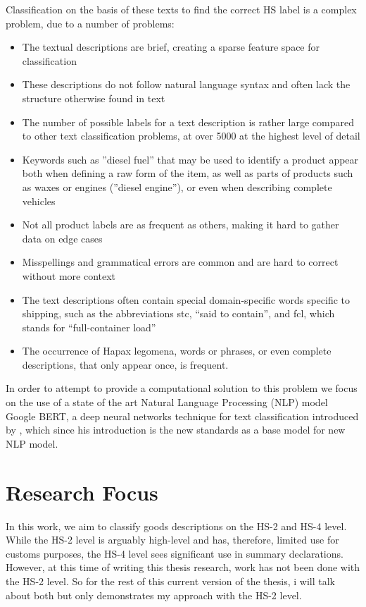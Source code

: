 Classification on the basis of these texts to find the correct HS label is a complex problem, due to a number of problems:
\begin{itemize}
\item The textual descriptions are brief, creating a sparse feature space for classification
\item These descriptions do not follow natural language syntax and often lack the structure otherwise found in text
\item The number of possible labels for a text description is rather large compared to other text classification problems, at over 5000 at the highest level of detail
\item Keywords such as ”diesel fuel” that may be used to identify a product appear both when defining a raw form of the item, as well as parts of products such as waxes or engines (”diesel engine”), or even when describing complete vehicles
\item Not all product labels are as frequent as others, making it hard to gather data on edge cases
\item Misspellings and grammatical errors are common \cite{Li2016} and are hard to correct without more context
\item The text descriptions often contain special domain-specific words specific to shipping, such as the abbreviations stc, “said to contain”, and fcl, which stands for “full-container load”
\item The occurrence of Hapax legomena, words or phrases, or even complete descriptions, that only appear once, is frequent.
\end{itemize}

In order to attempt to provide a computational solution to this problem we focus on the use of a state of the art Natural Language Processing (NLP) model Google BERT, a deep neural networks technique for text classification introduced by \cite{Devlin2018}, which since his introduction is the new standards as a base model for new NLP model. \\


\section{Research Focus}
In this work, we aim to classify goods descriptions on the HS-2 and HS-4 level. While the HS-2 level is arguably high-level and has, therefore, limited use for customs purposes, the HS-4 level sees significant use in summary declarations. However, at this time of writing this thesis research, work has not been done with the HS-2 level. So for the rest of this current version of the thesis, i will talk about both but only demonstrates my approach with the HS-2 level.

